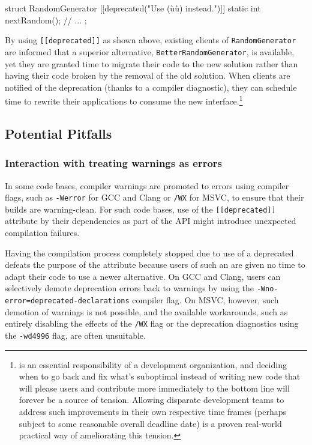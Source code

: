 \begin{emcppslisting}
struct RandomGenerator
{
    [[deprecated("Use (ù{}ù) instead.")]]
    static int nextRandom();
        // ...
};
\end{emcppslisting}
    
\noindent By using \lstinline![[deprecated]]! as shown above, existing clients of
\lstinline!RandomGenerator! are informed that a superior
alternative, \lstinline!BetterRandomGenerator!, is available, yet they are granted time to
migrate their code to the new solution rather than having their code broken by the
removal of the old solution. When clients are notified of the
deprecation (thanks to a compiler diagnostic), they can schedule time to rewrite their applications to consume the new interface.{\cprotect\footnote{ is
an essential responsibility of a development organization, and
deciding when to go back and fix what's suboptimal instead of writing
new code that will please users and contribute more immediately to the
bottom line will forever be a source of tension. Allowing disparate
development teams to address such improvements in their own respective
time frames (perhaps subject to some reasonable overall deadline
date) is a proven real-world practical way of ameliorating this
  tension.}}

\subsection[Potential Pitfalls]{Potential Pitfalls}\label{potential-pitfalls}

\subsubsection[Interaction with treating warnings as errors]{Interaction with treating warnings as errors}\label{interaction-with--werror-(e.g,-gcc,-clang)-or-/wx-(msvc)}

In some code bases, compiler warnings are promoted to errors using compiler flags, such as \lstinline!-Werror! for GCC and Clang or \lstinline!/WX! for MSVC, to ensure that their builds are warning-clean. For such code bases, use of the \lstinline![[deprecated]]! attribute by their dependencies as part of the API might introduce unexpected compilation failures. 

Having the compilation process completely stopped due to use of a
deprecated  defeats the purpose of the attribute because users of such an  are given no time to adapt their code
to use a newer alternative. On GCC and Clang, users can selectively demote deprecation errors back to warnings by using the
\lstinline!-Wno-error=deprecated-declarations! compiler flag. On MSVC,
however, such demotion of warnings is not possible, and the available workarounds, such as entirely disabling the effects of the \lstinline!/WX! flag or the deprecation diagnostics using the  \lstinline!-wd4996! flag, are often unsuitable.

